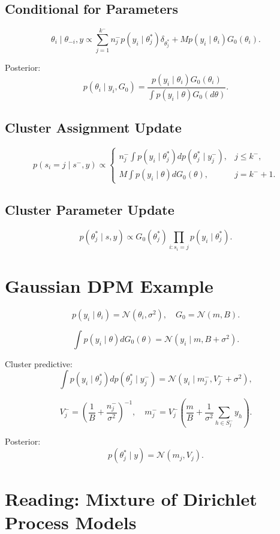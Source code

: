 \documentclass[12pt,oneside]{book}
\numberwithin{equation}{section}
\theoremstyle{definition}
\theoremstyle{plain}
\theoremstyle{remark}
\begin{document}
\subsection{Conditional for Parameters}

\[
\theta_i \mid \theta_{-i}, y
\propto
\sum_{j=1}^{k^-} n_j^- p(y_i \mid \theta_j^*) \delta_{\theta_j^*}
+
M p(y_i \mid \theta_i) G_0(\theta_i).
\]

Posterior:
\[
p(\theta_i \mid y_i, G_0)
=
\frac{p(y_i \mid \theta_i)G_0(\theta_i)}{\int p(y_i \mid \theta)G_0(d\theta)}.
\]

\subsection{Cluster Assignment Update}

\[
p(s_i = j \mid s^{-}, y)
\propto
\begin{cases}
n_j^- \int p(y_i \mid \theta_j^*) d p(\theta_j^* \mid y_j^-), & j \le k^-, \\
M \int p(y_i \mid \theta) dG_0(\theta), & j = k^-+1.
\end{cases}
\]

\subsection{Cluster Parameter Update}

\[
p(\theta_j^* \mid s,y)
\propto
G_0(\theta_j^*) \prod_{i:s_i=j} p(y_i \mid \theta_j^*).
\]

\section{Gaussian DPM Example}

\[
p(y_i \mid \theta_i) = \mathcal{N}(\theta_i,\sigma^2),
\quad
G_0 = \mathcal{N}(m,B).
\]

\[
\int p(y_i \mid \theta)dG_0(\theta)
=
\mathcal{N}(y_i \mid m, B+\sigma^2).
\]

Cluster predictive:
\[
\int p(y_i \mid \theta_j^*) d p(\theta_j^* \mid y_j^-)
=
\mathcal{N}(y_i \mid m_j^-, V_j^- + \sigma^2),
\]

\[
V_j^- = \left(\frac{1}{B} + \frac{n_j^-}{\sigma^2}\right)^{-1},
\quad
m_j^- = V_j^- \left(\frac{m}{B} + \frac{1}{\sigma^2}\sum_{h\in S_j^-} y_h \right).
\]

Posterior:
\[
p(\theta_j^* \mid y)
=
\mathcal{N}(m_j, V_j).
\]

\section{Reading: Mixture of Dirichlet Process Models}
\end{document}
